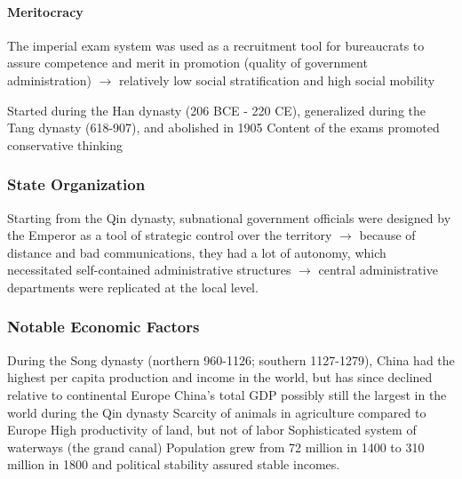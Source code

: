 \documentclass[11pt]{article}
\theoremstyle{definition}
\theoremstyle{remark}
\begin{document}
\paragraph{Meritocracy}
The imperial exam system was used as a recruitment tool for bureaucrats to assure competence and merit in promotion (quality of government administration) $\to$ relatively low social stratification and high social mobility
\begin{outline}[enumerate]
\1 Started during the Han dynasty (206 BCE - 220 CE), generalized during the Tang dynasty (618-907), and abolished in 1905
\1 Content of the exams promoted conservative thinking
\end{outline}

\subsubsection{State Organization}
Starting from the Qin dynasty, subnational government officials were designed by the Emperor as a tool of strategic control over the territory $\to$ because of distance and bad communications, they had a lot of autonomy, which necessitated self-contained administrative structures $\to$ central administrative departments were replicated at the local level.

\subsubsection{Notable Economic Factors}
\begin{outline}[enumerate]
\1 During the Song dynasty (northern 960-1126; southern 1127-1279), China had the highest per capita production and income in the world, but has since declined relative to continental Europe
	\2 China's total GDP possibly still the largest in the world during the Qin dynasty
	\2 Scarcity of animals in agriculture compared to Europe
	\2 High productivity of land, but not of labor
\1 Sophisticated system of waterways (the grand canal)
\1 Population grew from 72 million in 1400 to 310 million in 1800 and political stability assured stable incomes.
\end{outline}
\end{document}
